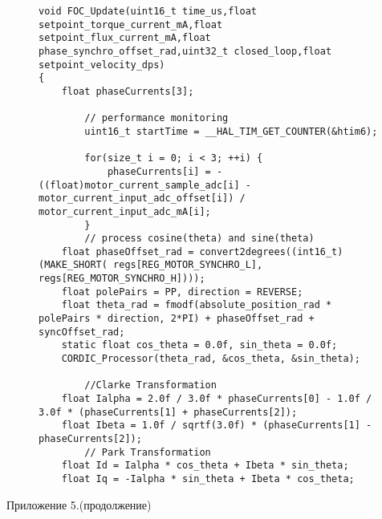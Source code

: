 \begin{figure}[H]
	\centering
	\begin{verbatim}
void FOC_Update(uint16_t time_us,float setpoint_torque_current_mA,float setpoint_flux_current_mA,float phase_synchro_offset_rad,uint32_t closed_loop,float setpoint_velocity_dps)
{
    float phaseCurrents[3];

		// performance monitoring
        uint16_t startTime = __HAL_TIM_GET_COUNTER(&htim6);

        for(size_t i = 0; i < 3; ++i) {
            phaseCurrents[i] = -((float)motor_current_sample_adc[i] - motor_current_input_adc_offset[i]) / motor_current_input_adc_mA[i];
        }
		// process cosine(theta) and sine(theta)
    float phaseOffset_rad = convert2degrees((int16_t)(MAKE_SHORT( regs[REG_MOTOR_SYNCHRO_L], regs[REG_MOTOR_SYNCHRO_H])));
    float polePairs = PP, direction = REVERSE;
    float theta_rad = fmodf(absolute_position_rad * polePairs * direction, 2*PI) + phaseOffset_rad + syncOffset_rad;
    static float cos_theta = 0.0f, sin_theta = 0.0f;
    CORDIC_Processor(theta_rad, &cos_theta, &sin_theta);

        //Clarke Transformation
    float Ialpha = 2.0f / 3.0f * phaseCurrents[0] - 1.0f / 3.0f * (phaseCurrents[1] + phaseCurrents[2]);
    float Ibeta = 1.0f / sqrtf(3.0f) * (phaseCurrents[1] - phaseCurrents[2]);
		// Park Transformation
	float Id = Ialpha * cos_theta + Ibeta * sin_theta;
    float Iq = -Ialpha * sin_theta + Ibeta * cos_theta;
\end{verbatim}
\end{figure}
\newpage
\hfill \large Приложение 5.(продолжение)


